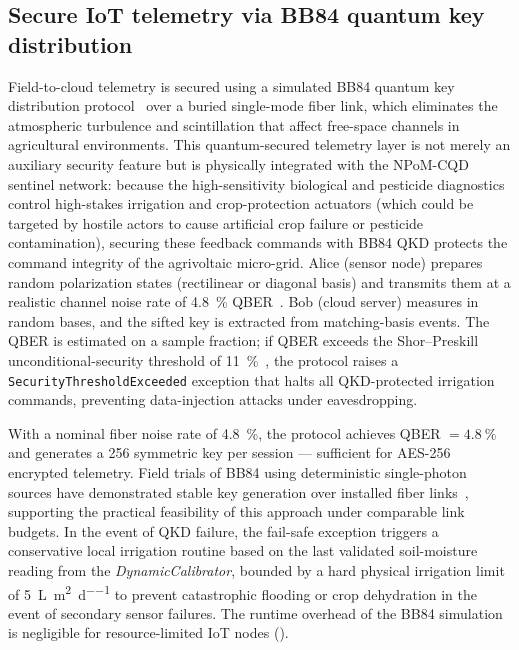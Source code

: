 \documentclass[preprint,12pt]{elsarticle}
\begin{document}
\subsection*{Secure IoT telemetry via BB84 quantum key distribution}

Field-to-cloud telemetry is secured using a simulated BB84 quantum key distribution protocol~\cite{Bennett1984} over a buried single-mode fiber link, which eliminates the atmospheric turbulence and scintillation that affect free-space channels in agricultural environments. This quantum-secured telemetry layer is not merely an auxiliary security feature but is physically integrated with the NPoM-CQD sentinel network: because the high-sensitivity biological and pesticide diagnostics control high-stakes irrigation and crop-protection actuators (which could be targeted by hostile actors to cause artificial crop failure or pesticide contamination), securing these feedback commands with BB84 QKD protects the command integrity of the agrivoltaic micro-grid. Alice (sensor node) prepares random polarization states (rectilinear or diagonal basis) and transmits them at a realistic channel noise rate of \qty{4.8}{\percent} QBER~\cite{Zahidy2024}.
Bob (cloud server) measures in random bases, and the sifted key is extracted from matching-basis events.
The QBER is estimated on a sample fraction; if QBER exceeds the Shor--Preskill unconditional-security threshold of \qty{11}{\percent}~\cite{Shor2000}, the protocol raises a \texttt{SecurityThresholdExceeded} exception that halts all QKD-protected irrigation commands, preventing data-injection attacks under eavesdropping.

With a nominal fiber noise rate of \qty{4.8}{\percent}, the protocol achieves QBER $= \qty{4.8}{\percent}$ and generates a \qty{256}{\bit} symmetric key per session --- sufficient for AES-256 encrypted telemetry.
Field trials of BB84 using deterministic single-photon sources have demonstrated stable key generation over installed fiber links~\cite{Zahidy2024}, supporting the practical feasibility of this approach under comparable link budgets.
In the event of QKD failure, the fail-safe exception triggers a conservative local irrigation routine based on the last validated soil-moisture reading from the \textit{DynamicCalibrator}, bounded by a hard physical irrigation limit of \qty{5}{\L\per\m\squared\per\day} to prevent catastrophic flooding or crop dehydration in the event of secondary sensor failures. The runtime overhead of the BB84 simulation is negligible for resource-limited IoT nodes ().
\end{document}
